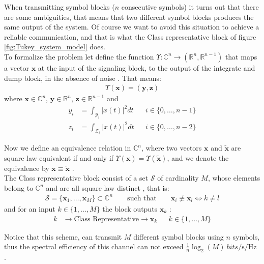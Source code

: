When transmitting symbol blocks ($n$ consecutive symbols) it turns out that there are some ambiguities, that means that two different symbol blocks produces the same output of the system. Of course we want to avoid this situation to achieve a reliable communication, and that is what the Class representative block of figure \ref{fig:Tukey_system_model} does.\\

To formalize the problem let define the function $\Upsilon: \mathds{C}^n\to(\mathds{R}^n,\mathds{R}^{n-1})$ that maps a vector $\bm x$ at the input of the signaling block, to the output of the integrate and dump block, in the absence of noise \cite{Tasbihi_Tukey}. That means:
\begin{align}
	\Upsilon(\bm x) = (\bm y, \bm z)
\end{align}
where $\bm x\in\mathds{C}^n$, $\bm y\in\mathds{R}^n$, $\bm z\in\mathds{R}^{n-1}$ and 
\begin{align}
	y_i&=\int_{\mathcal Y_i}\bigl|x(t)\bigr|^2dt&&i\in \{0,\dotsc,n-1\}\\
	z_i&=\int_{\mathcal Z_i}\bigl|x(t)\bigr|^2dt&&i\in \{0,\dotsc,n-2\}
\end{align}

Now we define an equivalence relation in $\mathds C^n$, where two vectors $\bm x$ and $\bm{\tilde{x}}$ are square law equivalent if and only if $\Upsilon(\bm x)=\Upsilon(\bm{\tilde{x}})$, and we denote the equivalence by $\bm x \equiv \bm{\tilde{x}}$ \cite{Tasbihi_Tukey}.\\

The Class representative block consist of a set $\mathcal S$ of cardinality $M$, whose elements belong to $\mathds{C}^n$ and are all square law distinct \cite{Tasbihi_Tukey}, that is:
\begin{align}
	\mathcal S = \{\bm x_1, \dotsc,\bm x_M\} \subset\mathds C^n\qquad \text{such that}\qquad\bm x_i\not\equiv\bm x_l \Leftrightarrow k\neq l
\end{align}
and for an input $k\in\{1,\dotsc,M\}$ the block outputs $\bm x_k$ \cite{Tasbihi_Tukey}:
\begin{align}
	k& \longrightarrow\text{Class Representative}\longrightarrow \bm x_k && k\in\{1,\dotsc,M\}
\end{align} 

Notice that this scheme, can transmit $M$ different symbol blocks using $n$ symbols, thus the spectral efficiency of this channel can not exceed $\frac{1}{n}\log_2(M)\SI{}{bits/\s/\Hz}$ \cite{Tasbihi_Tukey}.

